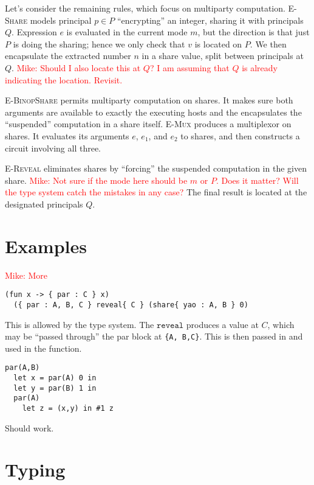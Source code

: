 \documentclass[10pt]{article}
\newcommand{\rulelab}[1]{{\small \textsc{#1}}}
\newcommand{\kw}[1]{\ensuremath{\mathtt{#1}}}
\newcommand{\mwh}[1]{\textcolor{red}{Mike: #1}}
\begin{document}
Let's consider the remaining rules, which focus on multiparty
computation. \rulelab{E-Share} models principal $p \in P$
``encrypting'' an integer, sharing it with principals $Q$. Expression
$e$ is evaluated in the current mode $m$, but the direction is that
just $P$ is doing the sharing; hence we only check that $v$ is located
on $P$. We then encapsulate the extracted number $n$ in a share value,
split between principals at $Q$. \mwh{Should I also locate this at
  $Q$? I am assuming that $Q$ is already indicating the
  location. Revisit.}

\rulelab{E-BinopShare} permits multiparty computation on shares. It
makes sure both arguments are available to exactly the executing hosts
and the encapsulates the ``suspended'' computation in a share
itself. \rulelab{E-Mux} produces a multiplexor on shares. It evaluates
its arguments $e$, $e_1$, and $e_2$ to shares, and then constructs a
circuit involving all three.

\rulelab{E-Reveal} eliminates shares by ``forcing'' the suspended
computation in the given share. \mwh{Not sure if the mode here should
  be $m$ or $P$. Does it matter? Will the type system catch the
  mistakes in any case?} The final result is located at the designated
principals $Q$. 

\section{Examples}

\mwh{More}

\begin{verbatim}
(fun x -> { par : C } x) 
  ({ par : A, B, C } reveal{ C } (share{ yao : A, B } 0)
\end{verbatim}
This is allowed by the type system. The $\kw{reveal}$ produces a value
at $C$, which may be ``passed through'' the par block at \verb+{A, B,C}+. 
This is then passed in and used in the function.

\begin{verbatim}
par(A,B) 
  let x = par(A) 0 in
  let y = par(B) 1 in
  par(A) 
    let z = (x,y) in #1 z
\end{verbatim}
Should work.

\section{Typing}
\end{document}
